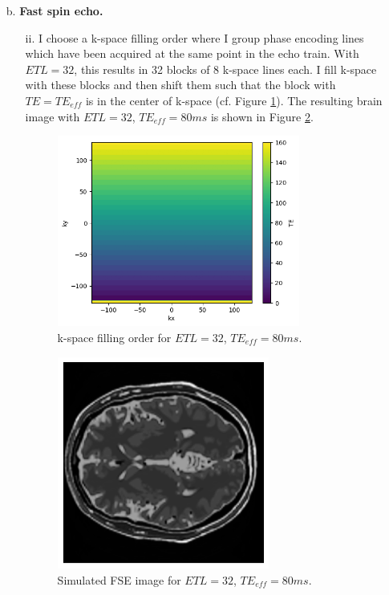 \documentclass{article}
\begin{document}
\begin{itemize}
    \item[b. ] \textbf{Fast spin echo.}
    
    \begin{itemize}
        \item[ii.] I choose a k-space filling order where I group phase encoding lines which have been acquired at the same point in the echo train. With $ETL=32$, this results in 32 blocks of 8 k-space lines each. I fill k-space with these blocks and then shift them such that the block with $TE=TE_{eff}$ is in the center of k-space (cf. Figure \ref{fig:2_b_ii_kspace}). The resulting brain image with $ETL=32$, $TE_{eff}=80ms$ is shown in Figure \ref{fig:2_b_ii_image}.
        
        \begin{figure}[]
            \centering
            \includegraphics[width=0.8\textwidth]{figures/2_b_ii_kspace.png}
            \caption{k-space filling order for $ETL=32$, $TE_{eff}=80ms$.}
            \label{fig:2_b_ii_kspace}
        \end{figure}

        \begin{figure}[]
            \centering
            \includegraphics[width=0.7\textwidth]{figures/2_b_ii_image.png}
            \caption{Simulated FSE image for $ETL=32$, $TE_{eff}=80ms$.}
            \label{fig:2_b_ii_image}
        \end{figure}

    \end{itemize}
    

\end{itemize}
\end{document}
